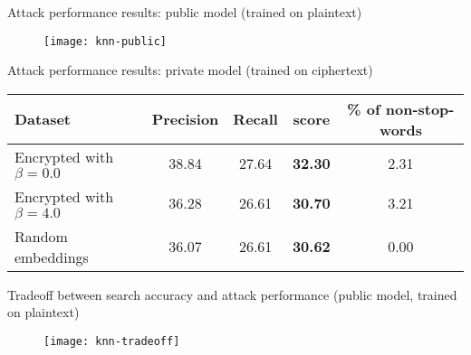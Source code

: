 	\begin{frame}{Attack performance results: public model (trained on plaintext)}

		\begin{figure}[h]
			\centering
			\texttt{[image: knn-public]}
		\end{figure}

	\end{frame}

	\begin{frame}{Attack performance results: private model (trained on ciphertext)}

		\begin{table}[!ht]
			\begin{tabular*}{\linewidth}{ !{\extracolsep\fill} l c c >{\bfseries}c c } %
				\toprule
					Dataset							& Precision		& Recall	& \FOne{} score & \% of non-stop-words	\\
				\midrule
					Encrypted with $\beta = 0.0$	& 38.84			& 27.64		& 32.30			& 2.31					\\
					Encrypted with $\beta = 4.0$	& 36.28			& 26.61		& 30.70			& 3.21					\\
					Random embeddings				& 36.07			& 26.61		& 30.62			& 0.00					\\
				\bottomrule
			\end{tabular*}
		\end{table}

	\end{frame}

	\begin{frame}{Tradeoff between search accuracy and attack performance (public model, trained on plaintext)}

		\begin{figure}[h]
			\centering
			\texttt{[image: knn-tradeoff]}
		\end{figure}

	\end{frame}
